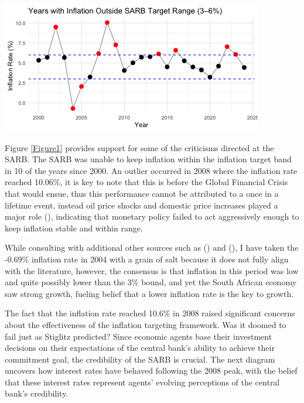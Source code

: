 \documentclass[11pt,preprint]{elsarticle}
\let\origfigure\figure
\let\endorigfigure\endfigure
\renewenvironment{figure}[1][2] {
    \expandafter\origfigure\expandafter[H]
} {
    \endorigfigure
}
\numberwithin{equation}{section}
\numberwithin{figure}{section}
\numberwithin{table}{section}
\begin{document}
\begin{figure}[H]

{\centering \includegraphics{DatSci-Project-_files/figure-latex/Figure1-1} 

}

\caption{Inflation Rates Since 2000 \label{Figure1}}\label{fig:Figure1}
\end{figure}

Figure \ref{Figure1} provides support for some of the criticisms
directed at the SARB. The SARB was unable to keep inflation within the
inflation target band in 10 of the years since 2000. An outlier occurred
in 2008 where the inflation rate reached 10.06\%, it is key to note that
this is before the Global Financial Crisis that would ensue, thus this
performance cannot be attributed to a once in a lifetime event, instead
oil price shocks and domestic price increases played a major role
(), indicating
that monetary policy failed to act aggressively enough to keep inflation
stable and within range.

\newpage

While consulting with additional other sources such as
() and
(), I have taken the -0.69\%
inflation rate in 2004 with a grain of salt because it does not fully
align with the literature, however, the consensus is that inflation in
this period was low and quite possibly lower than the 3\% bound, and yet
the South African economy saw strong growth, fueling belief that a lower
inflation rate is the key to growth.

The fact that the inflation rate reached 10.6\% in 2008 raised
significant concerns about the effectiveness of the inflation targeting
framework. Was it doomed to fail just as Stiglitz predicted? Since
economic agents base their investment decisions on their expectations of
the central bank's ability to achieve their commitment goal, the
credibility of the SARB is crucial. The next diagram uncovers how
interest rates have behaved following the 2008 peak, with the belief
that these interest rates represent agents' evolving perceptions of the
central bank's credibility.
\end{document}
